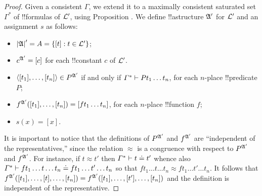 \documentclass[../../include/open-logic-section]{subfiles}
\begin{document}
\begin{proof}
  Given a consistent $\Gamma$, we extend it to a maximally consistent
  saturated set $\Gamma^*$ of !!{formula}s of $\mathcal L'$, using
  Proposition . We define !!a{structure}
  $\mathfrak A'$ for $\mathcal L'$ and an assignment $s$ as follows:
  \begin{itemize}
  \item $\left| \mathfrak A \right|' = A = \{ [t] : t \in \mathcal L'\}$;
  \item $c^{\mathfrak A'} = [c]$ for each !!{constant} $c$ of $\mathcal L'$.
  \item $\langle [t_1],\ldots,[t_n]\rangle \in P^{\mathfrak A'}$ if
    and only if $\Gamma^* \Proves Pt_1\ldots t_n$, for each $n$-place
    !!{predicate} $P$;
  \item $f^{\mathfrak A'}([t_1],\ldots,[t_n]) = [ft_1\ldots t_n]$,
    for each $n$-place !!{function} $f$;
  \item $s(x) = [x]$.
 \end{itemize}
 It is important to notice that the definitions of $P^{\mathfrak A'}$
 and $f^{\mathfrak A'}$ are ``independent of the representatives,''
 since the relation $\approx$ is a congruence with respect to
 $P^{\mathfrak A'}$ and $f^{\mathfrak A'}$. For instance, if $t
 \approx t'$ then $\Gamma^* \Proves t \doteq t'$ whence also $\Gamma^*
 \Proves ft_1\ldots t\ldots t_n \doteq ft_1\ldots t'\ldots t_n$ so that
 $ft_1\ldots t\ldots t_n \approx ft_1\ldots t'\ldots t_n$. It follows
 that $f^{\mathfrak A'}([t_1],\ldots,[t],\ldots,[t_n]) =
 f^{\mathfrak A'}([t_1],\ldots,[t'],\ldots,[t_n])$ and the definition
 is independent of the representative.


\end{proof}
\end{document}
